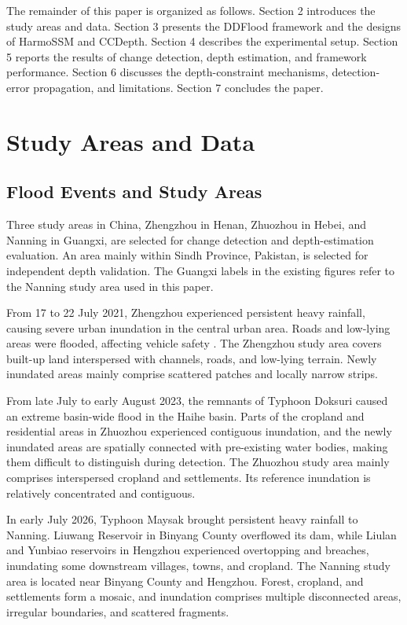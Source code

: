 \documentclass[authoryear,preprint,12pt]{elsarticle}
\begin{document}
The remainder of this paper is organized as follows. Section 2 introduces the study areas and data. Section 3 presents the DDFlood framework and the designs of HarmoSSM and CCDepth. Section 4 describes the experimental setup. Section 5 reports the results of change detection, depth estimation, and framework performance. Section 6 discusses the depth-constraint mechanisms, detection-error propagation, and limitations. Section 7 concludes the paper.

\section{Study Areas and Data}

\subsection{Flood Events and Study Areas}

Three study areas in China, Zhengzhou in Henan, Zhuozhou in Hebei, and Nanning in Guangxi, are selected for change detection and depth-estimation evaluation. An area mainly within Sindh Province, Pakistan, is selected for independent depth validation. The Guangxi labels in the existing figures refer to the Nanning study area used in this paper.

From 17 to 22 July 2021, Zhengzhou experienced persistent heavy rainfall, causing severe urban inundation in the central urban area. Roads and low-lying areas were flooded, affecting vehicle safety \citep{dong2022urbanrisk}. The Zhengzhou study area covers built-up land interspersed with channels, roads, and low-lying terrain. Newly inundated areas mainly comprise scattered patches and locally narrow strips.

From late July to early August 2023, the remnants of Typhoon Doksuri caused an extreme basin-wide flood in the Haihe basin. Parts of the cropland and residential areas in Zhuozhou experienced contiguous inundation, and the newly inundated areas are spatially connected with pre-existing water bodies, making them difficult to distinguish during detection. The Zhuozhou study area mainly comprises interspersed cropland and settlements. Its reference inundation is relatively concentrated and contiguous.

In early July 2026, Typhoon Maysak brought persistent heavy rainfall to Nanning. Liuwang Reservoir in Binyang County overflowed its dam, while Liulan and Yunbiao reservoirs in Hengzhou experienced overtopping and breaches, inundating some downstream villages, towns, and cropland. The Nanning study area is located near Binyang County and Hengzhou. Forest, cropland, and settlements form a mosaic, and inundation comprises multiple disconnected areas, irregular boundaries, and scattered fragments.
\end{document}
